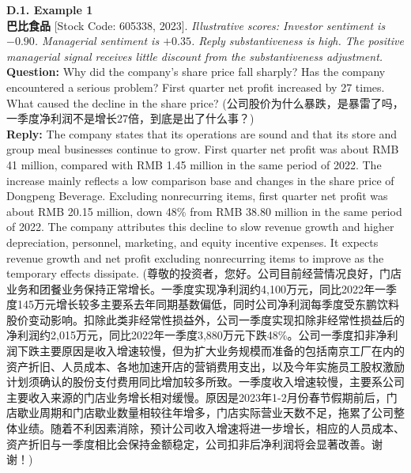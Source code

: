 \noindent \textbf{D.1. Example 1} \\
\textbf{巴比食品} [Stock Code: 605338, 2023]. \textit{Illustrative scores: Investor sentiment is $-0.90$. Managerial sentiment is $+0.35$. Reply substantiveness is high. The positive managerial signal receives little discount from the substantiveness adjustment.} \\
\textbf{Question:} Why did the company's share price fall sharply? Has the company encountered a serious problem? First quarter net profit increased by 27 times. What caused the decline in the share price? (公司股价为什么暴跌，是暴雷了吗，一季度净利润不是增长27倍，到底是出了什么事？) \\
\textbf{Reply:} The company states that its operations are sound and that its store and group meal businesses continue to grow. First quarter net profit was about RMB 41 million, compared with RMB 1.45 million in the same period of 2022. The increase mainly reflects a low comparison base and changes in the share price of Dongpeng Beverage. Excluding nonrecurring items, first quarter net profit was about RMB 20.15 million, down 48\% from RMB 38.80 million in the same period of 2022. The company attributes this decline to slow revenue growth and higher depreciation, personnel, marketing, and equity incentive expenses. It expects revenue growth and net profit excluding nonrecurring items to improve as the temporary effects dissipate. (尊敬的投资者，您好。公司目前经营情况良好，门店业务和团餐业务保持正常增长。一季度实现净利润约4,100万元，同比2022年一季度145万元增长较多主要系去年同期基数偏低，同时公司净利润每季度受东鹏饮料股价变动影响。扣除此类非经常性损益外，公司一季度实现扣除非经常性损益后的净利润约2,015万元，同比2022年一季度3,880万元下跌48\%。公司一季度扣非净利润下跌主要原因是收入增速较慢，但为扩大业务规模而准备的包括南京工厂在内的资产折旧、人员成本、各地加速开店的营销费用支出，以及今年实施员工股权激励计划须确认的股份支付费用同比增加较多所致。一季度收入增速较慢，主要系公司主要收入来源的门店业务增长相对缓慢。原因是2023年1-2月份春节假期前后，门店歇业周期和门店歇业数量相较往年增多，门店实际营业天数不足，拖累了公司整体业绩。随着不利因素消除，预计公司收入增速将进一步增长，相应的人员成本、资产折旧与一季度相比会保持金额稳定，公司扣非后净利润将会显著改善。谢谢！)
\vspace{0.4cm}

